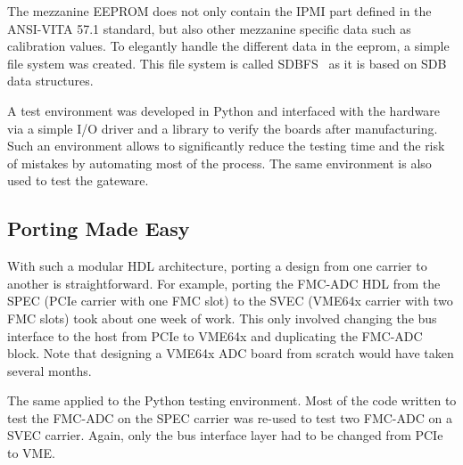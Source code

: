 \documentclass{JAC2003}
\begin{document}
The mezzanine EEPROM does not only contain the IPMI part defined in the ANSI-VITA 57.1 standard, but also other mezzanine specific data such as calibration values.
To elegantly handle the different data in the eeprom, a simple file system was created.
This file system is called SDBFS~\cite{sdbfs} as it is based on SDB data structures.



A test environment was developed in Python and interfaced with the hardware via a simple I/O driver and a library to verify the boards after manufacturing.
Such an environment allows to significantly reduce the testing time and the risk of mistakes by automating most of the process.
The same environment is also used to test the gateware.

\subsection{Porting Made Easy}
With such a modular HDL architecture, porting a design from one carrier to another is straightforward.
For example, porting the FMC-ADC HDL from the SPEC (PCIe carrier with one FMC slot) to the SVEC (VME64x carrier with two FMC slots) took about one week of work.
This only involved changing the bus interface to the host from PCIe to VME64x and duplicating the FMC-ADC block.
Note that designing a VME64x ADC board from scratch would have taken several months.

The same applied to the Python testing environment.
Most of the code written to test the FMC-ADC on the SPEC carrier was re-used to test two FMC-ADC on a SVEC carrier.
Again, only the bus interface layer had to be changed from PCIe to VME.

\begin{comment}
\subsection{Release Concept REMOVE TO ADD PICTURE}
Usually, a single product involves several different OHWR projects.
By product, we mean a functional set of carrier and mezzanine boards along with gateware and software (e.g FMC-ADC + SPEC).
For a user to be able to use a product, at least three projects are needed; the carrier project for the golden bitstream, the mezzanine project for the application bitstream and the mezzanine software support project for the Linux device driver and test program.
To have better traceability, a release procedure was put in place.
For each component (gateware or software), the development is frozen into a \textit{release}.
In addition, compatible releases of the gateware and software are bundled together in an archive.
\end{comment}
\end{document}
